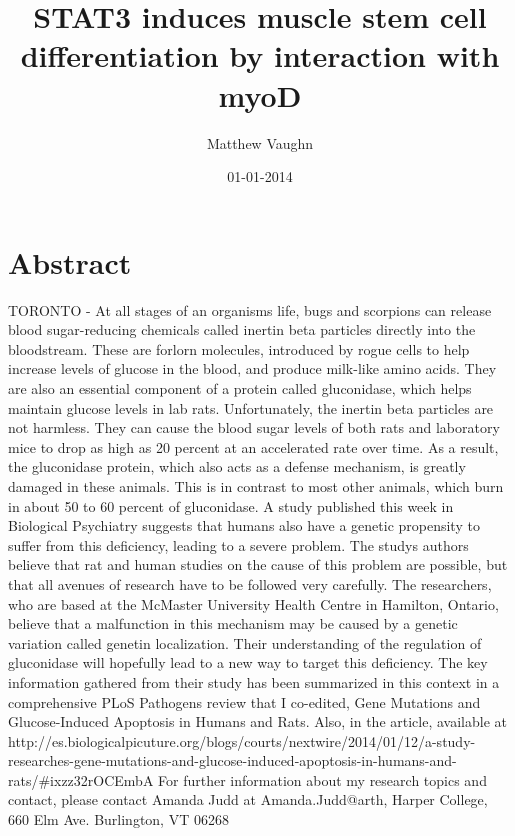\documentclass{article}%
\title{STAT3 induces muscle stem cell differentiation by interaction with myoD}%
\author{Matthew Vaughn}%
\affil{Institute of Medicine, Chung Shan Medical University, No. 110, Section 1, Jianguo N. Road, Taichung 402, Taiwan}%
\date{01{-}01{-}2014}%
\begin{document}
%
\normalsize%
\maketitle%
\section{Abstract}%
\label{sec:Abstract}%
TORONTO {-} At all stages of an organisms life, bugs and scorpions can release blood sugar{-}reducing chemicals called inertin beta particles directly into the bloodstream. These are forlorn molecules, introduced by rogue cells to help increase levels of glucose in the blood, and produce milk{-}like amino acids. They are also an essential component of a protein called gluconidase, which helps maintain glucose levels in lab rats.\newline%
Unfortunately, the inertin beta particles are not harmless. They can cause the blood sugar levels of both rats and laboratory mice to drop as high as 20 percent at an accelerated rate over time. As a result, the gluconidase protein, which also acts as a defense mechanism, is greatly damaged in these animals. This is in contrast to most other animals, which burn in about 50 to 60 percent of gluconidase.\newline%
A study published this week in Biological Psychiatry suggests that humans also have a genetic propensity to suffer from this deficiency, leading to a severe problem. The studys authors believe that rat and human studies on the cause of this problem are possible, but that all avenues of research have to be followed very carefully.\newline%
The researchers, who are based at the McMaster University Health Centre in Hamilton, Ontario, believe that a malfunction in this mechanism may be caused by a genetic variation called genetin localization. Their understanding of the regulation of gluconidase will hopefully lead to a new way to target this deficiency.\newline%
The key information gathered from their study has been summarized in this context in a comprehensive PLoS Pathogens review that I co{-}edited, Gene Mutations and Glucose{-}Induced Apoptosis in Humans and Rats.\newline%
Also, in the article, available at http://es.biologicalpicuture.org/blogs/courts/nextwire/2014/01/12/a{-}study{-}researches{-}gene{-}mutations{-}and{-}glucose{-}induced{-}apoptosis{-}in{-}humans{-}and{-}rats/\#ixzz32rOCEmbA\newline%
For further information about my research topics and contact, please contact Amanda Judd at Amanda.Judd@arth, Harper College, 660 Elm Ave. Burlington, VT 06268
\end{document}

